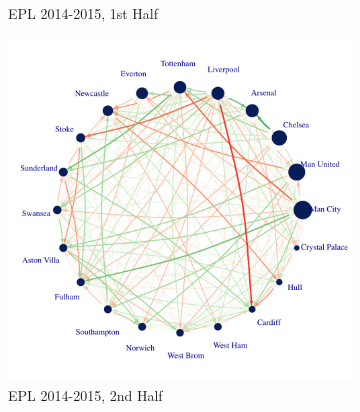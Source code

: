 \documentclass[12pt,a4paper,twoside,openany]{book}\usepackage[]{graphicx}\usepackage[]{color}
\makeatletter
\def\maxwidth{ %
  \ifdim\Gin@nat@width>\linewidth
    \linewidth
  \else
    \Gin@nat@width
  \fi
}
\newenvironment{knitrout}{}{} %
\makeatother
\begin{document}
\begin{figure}[H]
\begin{subfigure}{0.40\textwidth}
\begin{knitrout}
{}



\end{knitrout}
\caption{EPL 2014-2015, 1st Half}
\end{subfigure}\hspace*{\fill}
\begin{subfigure}{0.4\textwidth}
\begin{knitrout}
\color{fgcolor}

{\centering \includegraphics[width=\maxwidth]{figure/unnamed-chunk-10-1} 

}



\end{knitrout}
\caption{EPL 2014-2015, 2nd Half} 
\end{subfigure}
\hspace*{\fill}

\hspace*{\fill}
\begin{subfigure}{0.40\textwidth}
\begin{knitrout}
\color{fgcolor}


\end{knitrout}
\end{subfigure}
\end{figure}
\end{document}
